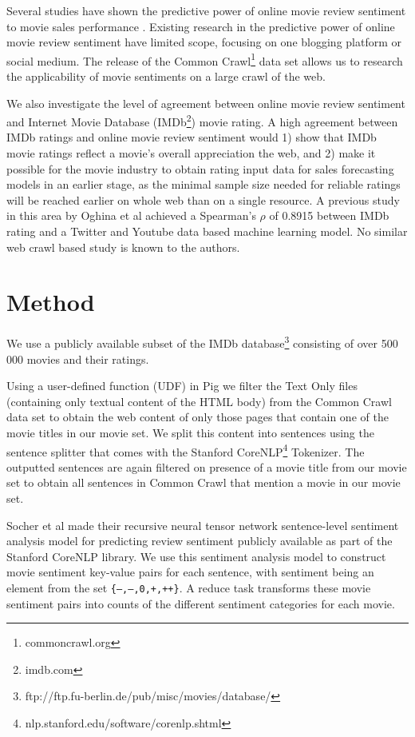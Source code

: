 \documentclass{sig-alternate-br}
\begin{document}
Several studies have shown the predictive power of online movie review sentiment to movie sales performance \cite{Mishne2006, Liu2007, Dellarocas2007, Asur2010, Joshi2010, Yu2012}. Existing research in the predictive power of online movie review sentiment have limited scope, focusing on one blogging platform or social medium. The release of the Common Crawl\footnote{commoncrawl.org} data set allows us to research the applicability of movie sentiments on a large crawl of the web.  

We also investigate the level of agreement between online movie review sentiment and Internet Movie Database (IMDb\footnote{imdb.com}) movie rating. A high agreement between IMDb ratings and online movie review sentiment would 1) show that IMDb movie ratings reflect a movie's overall appreciation the web, and 2) make it possible for the movie industry to obtain rating input data for sales forecasting models in an earlier stage, as the minimal sample size needed for reliable ratings will be reached earlier on whole web than on a single resource. A previous study in this area by Oghina et al \cite{Oghina2012} achieved a Spearman's $\rho$ of 0.8915 between IMDb rating and a Twitter and Youtube data based machine learning model. No similar web crawl based study is known to the authors.

\section{Method}
We use a publicly available subset of the IMDb database\footnote{ftp://ftp.fu-berlin.de/pub/misc/movies/database/} consisting of over 500 000 movies and their ratings.

Using a user-defined function (UDF) in Pig we filter the Text Only files (containing only textual content of the HTML body) from the Common Crawl data set to obtain the web content of only those pages that contain one of the movie titles in our movie set. We split this content into sentences using the sentence splitter that comes with the Stanford CoreNLP\footnote{nlp.stanford.edu/software/corenlp.shtml} Tokenizer. The outputted sentences are again filtered on presence of a movie title from our movie set to obtain all sentences in Common Crawl that mention a movie in our movie set.

Socher et al \cite{Socher2013} made their recursive neural tensor network sentence-level sentiment analysis model for predicting review sentiment publicly available as part of the Stanford CoreNLP library. We use this sentiment analysis model to construct movie sentiment key-value pairs for each sentence, with sentiment being an element from the set \texttt{\{\mbox{---},--,0,+,\mbox{++}\}}. A reduce task transforms these movie sentiment pairs into counts of the different sentiment categories for each movie. 
\end{document}

